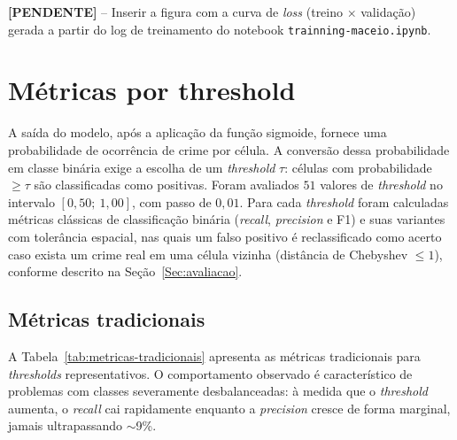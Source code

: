 \textbf{[PENDENTE]} -- Inserir a figura com a curva de \textit{loss} (treino $\times$ validação) gerada a partir do log de treinamento do notebook \texttt{trainning-maceio.ipynb}.

\section{Métricas por threshold}
\label{Sec:MetricasThreshold}

A saída do modelo, após a aplicação da função sigmoide, fornece uma probabilidade de ocorrência de crime por célula. A conversão dessa probabilidade em classe binária exige a escolha de um \textit{threshold} $\tau$: células com probabilidade $\geq \tau$ são classificadas como positivas. Foram avaliados $51$ valores de \textit{threshold} no intervalo $[0{,}50;\ 1{,}00]$, com passo de $0{,}01$. Para cada \textit{threshold} foram calculadas métricas clássicas de classificação binária (\textit{recall}, \textit{precision} e F1) e suas variantes com tolerância espacial, nas quais um falso positivo é reclassificado como acerto caso exista um crime real em uma célula vizinha (distância de Chebyshev $\leq 1$), conforme descrito na Seção~\ref{Sec:avaliacao}.

\subsection{Métricas tradicionais}
\label{Sec:MetricasTradicionais}

A Tabela~\ref{tab:metricas-tradicionais} apresenta as métricas tradicionais para \textit{thresholds} representativos. O comportamento observado é característico de problemas com classes severamente desbalanceadas: à medida que o \textit{threshold} aumenta, o \textit{recall} cai rapidamente enquanto a \textit{precision} cresce de forma marginal, jamais ultrapassando $\sim$9\%.

